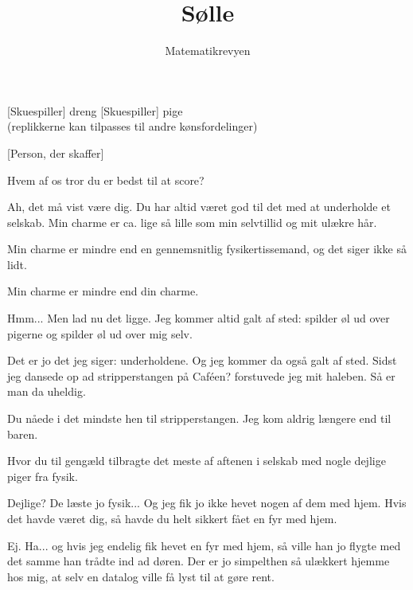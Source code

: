 \documentclass[a4paper,11pt]{article}
\title{Sølle}
\author{Matematikrevyen}
\begin{document}
\maketitle

\begin{roles}
[Skuespiller] dreng
[Skuespiller] pige \\
(replikkerne kan tilpasses til andre kønsfordelinger)
\end{roles}

\begin{props}
[Person, der skaffer]
\end{props}

\begin{sketch}

 Hvem af os tror du er bedst til at score?

 Ah, det må vist være dig. Du har altid været god til det med at underholde et selskab. Min charme er ca. lige så lille som min selvtillid og mit ulækre hår.

 Min charme er mindre end en gennemsnitlig fysikertissemand, og det siger ikke så lidt.

 Min charme er mindre end din charme.

 Hmm... Men lad nu det ligge. Jeg kommer altid galt af sted: spilder øl ud over pigerne og spilder øl ud over mig selv.

 Det er jo det jeg siger: underholdene. Og jeg kommer da også galt af sted. Sidst jeg dansede op ad stripperstangen på Caféen? forstuvede jeg mit haleben. Så er man da uheldig.

 Du nåede i det mindste hen til stripperstangen. Jeg kom aldrig længere end til baren.

 Hvor du til gengæld tilbragte det meste af aftenen i selskab med nogle dejlige piger fra fysik.

 Dejlige? De læste jo fysik... Og jeg fik jo ikke hevet nogen af dem med hjem. Hvis det havde været dig, så havde du helt sikkert fået en fyr med hjem.

 Ej. Ha... og hvis jeg endelig fik hevet en fyr med hjem, så ville han jo flygte med det samme han trådte ind ad døren. Der er jo simpelthen så ulækkert hjemme hos mig, at selv en datalog ville få lyst til at gøre rent.


\end{sketch}
\end{document}
